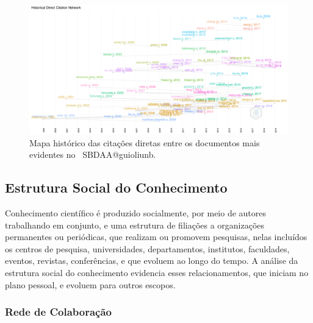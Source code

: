 \begin{figure}
    \centering
    \includegraphics[width=1\textwidth]{experiments/jhcf/PesqBibliogr/SimulacaoMultiagente/WoS-20220203/Estrutura/Intelectual/MASSA2-HistoricalDirectCitationNetwork-100docs.png}
    \caption{Mapa histórico das citações diretas entre os documentos mais evidentes no  \dataset\ SBDAA@guioliunb.}
    \label{fig:MASSA2-HistoricalDirectCitationNetwork-100docs}
\end{figure}

\subsection{Estrutura Social  do Conhecimento}

Conhecimento científico é produzido socialmente, por meio de autores trabalhando em conjunto, e uma estrutura de filiações a organizações permanentes ou periódicas, que realizam ou promovem pesquisas, nelas incluídos os centros de pesquisa, universidades, departamentos, institutos, faculdades, eventos, revistas, conferências, e que evoluem ao longo do tempo. A análise da estrutura social do conhecimento evidencia esses relacionamentos, que iniciam no plano pessoal, e evoluem para outros escopos.

\subsubsection{Rede de Colaboração}

